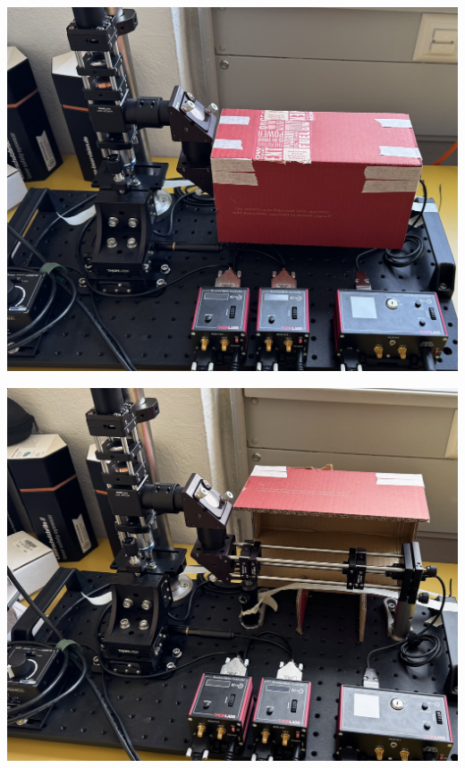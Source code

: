 \begin{minipage}{\textwidth}
    \vspace{2em}
    \begin{minipage}[c]{0.48\textwidth}
        \begin{center}
            \includegraphics[width=\textwidth]{assets/figures/Protections_laser/Securite_mecanique/Protection_entree_laser/carton_protection_ferme.jpeg}
        \end{center}
        \label{carton_protection_fermee}
    \end{minipage}\hfill
    \begin{minipage}[c]{0.48\textwidth}
        \begin{center}
            \includegraphics[width=\textwidth]{assets/figures/Protections_laser/Securite_mecanique/Protection_entree_laser/carton_protection_ouvert.jpeg}
        \end{center}
        \label{carton_protection_ouverte}
    \end{minipage}
\end{minipage}

